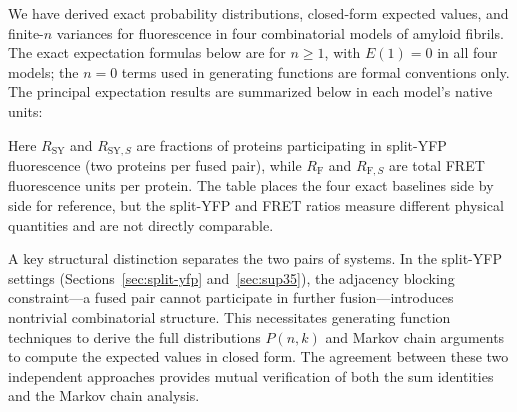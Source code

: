 \documentclass[11pt]{article}
\begin{document}
We have derived exact probability distributions, closed-form expected values, and finite-$n$ variances for fluorescence in four combinatorial models of amyloid fibrils. The exact expectation formulas below are for $n \ge 1$, with $E(1)=0$ in all four models; the $n=0$ terms used in generating functions are formal conventions only. The principal expectation results are summarized below in each model's native units:

\begin{center}
\end{center}
\noindent Here $R_{\text{SY}}$ and $R_{\text{SY},S}$ are fractions of proteins participating in split-YFP fluorescence (two proteins per fused pair), while $R_{\text{F}}$ and $R_{\text{F},S}$ are total FRET fluorescence units per protein. The table places the four exact baselines side by side for reference, but the split-YFP and FRET ratios measure different physical quantities and are not directly comparable.

A key structural distinction separates the two pairs of systems. In the split-YFP settings (Sections~\ref{sec:split-yfp} and~\ref{sec:sup35}), the adjacency blocking constraint---a fused pair cannot participate in further fusion---introduces nontrivial combinatorial structure. This necessitates generating function techniques to derive the full distributions $P(n,k)$ and Markov chain arguments to compute the expected values in closed form. The agreement between these two independent approaches provides mutual verification of both the sum identities and the Markov chain analysis.
\end{document}
